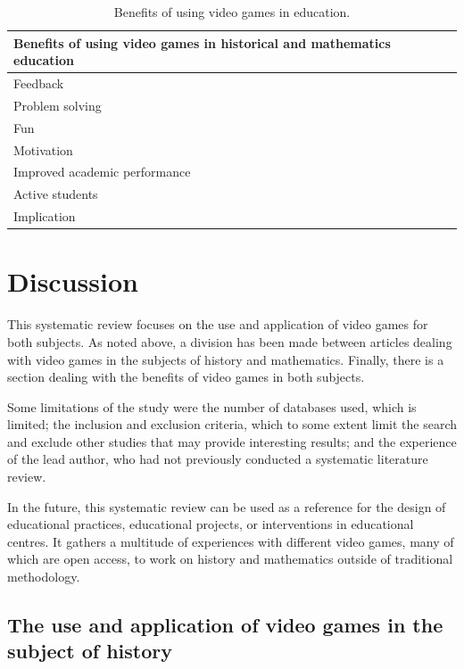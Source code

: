 \documentclass[english]{textolivre}
\begin{document}
\begin{table}[h!]
\centering
\begin{threeparttable}
\caption{Benefits of using video games in education.}
\label{tab03}
\begin{tabular}{l}
\toprule
Benefits of using video games in historical and mathematics education \\
\midrule
Feedback \\
Problem solving \\
Fun \\
Motivation \\
Improved academic performance \\
Active students \\
Implication \\
\bottomrule
\end{tabular}
\end{threeparttable}
\end{table}


\section{Discussion}\label{sec-fmt-manuscrito}
This systematic review focuses on the use and application of video games for both subjects. As noted above, a division has been made between articles dealing with video games in the subjects of history and mathematics. Finally, there is a section dealing with the benefits of video games in both subjects.

Some limitations of the study were the number of databases used, which is limited; the inclusion and exclusion criteria, which to some extent limit the search and exclude other studies that may provide interesting results; and the experience of the lead author, who had not previously conducted a systematic literature review.

In the future, this systematic review can be used as a reference for the design of educational practices, educational projects, or interventions in educational centres. It gathers a multitude of experiences with different video games, many of which are open access, to work on history and mathematics outside of traditional methodology.

\subsection{The use and application of video games in the subject of history}
\end{document}
